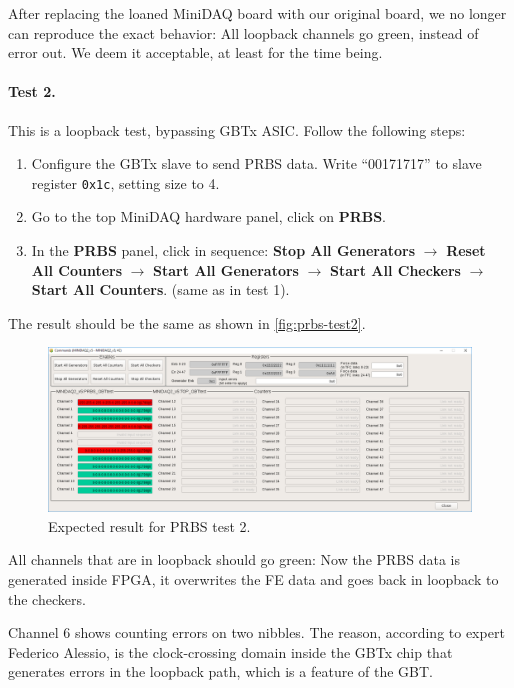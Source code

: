 After replacing the loaned MiniDAQ board with our original board, we no longer
can reproduce the exact behavior:
All loopback channels go green, instead of error out.
We deem it acceptable, at least for the time being.

\paragraph{Test 2.}
This is a loopback test, bypassing GBTx ASIC.
Follow the following steps:
\begin{enumerate}
    \item Configure the GBTx slave to send PRBS data. Write ``00171717'' to
        slave register \texttt{0x1c}, setting size to 4.
    \item Go to the top MiniDAQ hardware panel, click on \textbf{PRBS}.
    \item In the \textbf{PRBS} panel, click in sequence:
        \textbf{Stop All Generators} $\to$ \textbf{Reset All Counters} $\to$
        \textbf{Start All Generators} $\to$ \textbf{Start All Checkers} $\to$
        \textbf{Start All Counters}. (same as in test 1).
\end{enumerate}

The result should be the same as shown in \autoref{fig:prbs-test2}.

\begin{figure}[ht]
    \centering
    \includegraphics[width=\textwidth]{res/prbs_test2.png}
    \caption{Expected result for PRBS test 2.}
    \label{fig:prbs-test2}
\end{figure}

\begin{leftbar}
    All channels that are in loopback should go green: Now the PRBS data is
    generated inside FPGA, it overwrites the FE data and goes back in loopback
    to the checkers.
\end{leftbar}

\begin{leftbar}
    Channel 6  shows counting errors on two nibbles.
    The reason, according to expert Federico Alessio, is the clock-crossing
    domain inside the GBTx chip that generates errors in the loopback path,
    which is a feature of the GBT.
\end{leftbar}

